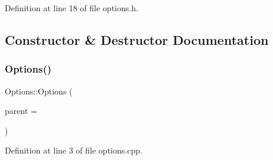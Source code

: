Definition at line 18 of file options.\+h.



\subsection{Constructor \& Destructor Documentation}
\hypertarget{class_options_a87403ad1d6bd9ae2b54af860bb0f0952}{}\label{class_options_a87403ad1d6bd9ae2b54af860bb0f0952} 
\subsubsection{\texorpdfstring{Options()}{Options()}}
{\footnotesize\ttfamily Options\+::\+Options (\begin{DoxyParamCaption}\item[{Q\+Widget $\ast$}]{parent = {} }\end{DoxyParamCaption})\hspace{0.3cm}{\ttfamily [explicit]}}



Definition at line 3 of file options.\+cpp.


